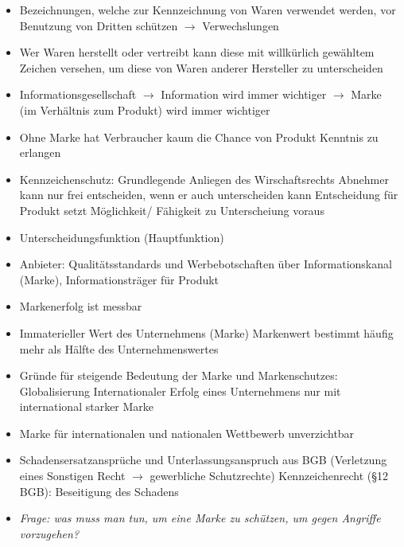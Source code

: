\documentclass{report}
\begin{document}
\begin{itemize}
	\item Bezeichnungen, welche zur Kennzeichnung von Waren verwendet werden, vor Benutzung von Dritten schützen $\rightarrow$ Verwechslungen
	\item Wer Waren herstellt oder vertreibt kann diese mit willkürlich gewähltem Zeichen versehen, um diese von Waren anderer Hersteller zu unterscheiden
	\item Informationsgesellschaft $\rightarrow$ Information wird immer wichtiger
	\newline $\rightarrow$ Marke (im Verhältnis zum Produkt) wird immer wichtiger
	\item Ohne Marke hat Verbraucher kaum die Chance von Produkt Kenntnis zu erlangen
	\item Kennzeichenschutz: Grundlegende Anliegen des Wirschaftsrechts
	\newline Abnehmer kann nur frei entscheiden, wenn er auch unterscheiden kann
	\newline Entscheidung für Produkt setzt Möglichkeit/ Fähigkeit zu Unterscheiung voraus
	\item Unterscheidungsfunktion (Hauptfunktion)
	\item Anbieter: Qualitätsstandards und Werbebotschaften über Informationskanal (Marke), Informationsträger für Produkt
	\item Markenerfolg ist messbar
	\item Immaterieller Wert des Unternehmens (Marke)
	\newline Markenwert bestimmt häufig mehr als Hälfte des Unternehmenswertes
	\item Gründe für steigende Bedeutung der Marke und Markenschutzes: Globalisierung
	\newline Internationaler Erfolg eines Unternehmens nur mit international starker Marke
	\item Marke für internationalen und nationalen Wettbewerb unverzichtbar
	\item Schadensersatzansprüche und Unterlassungsanspruch aus BGB
	\newline (Verletzung eines Sonstigen Recht $\rightarrow$ gewerbliche Schutzrechte)
	\newline Kennzeichenrecht (§12 BGB): Beseitigung des Schadens
	\item \textit{Frage: was muss man tun, um eine Marke zu schützen, um gegen Angriffe vorzugehen?}
\end{itemize}
\end{document}
